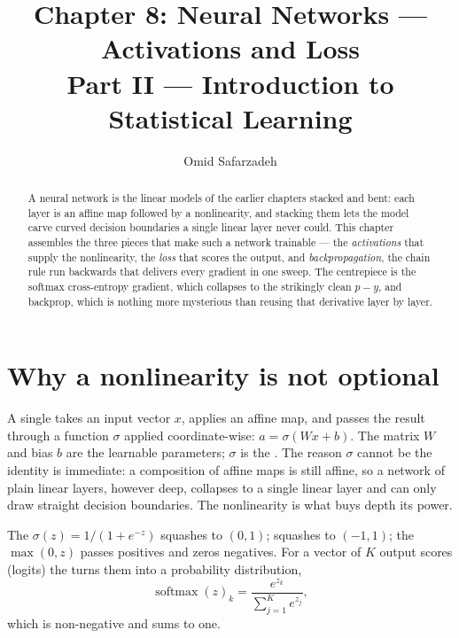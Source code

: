 \documentclass[11pt]{article}
\title{Chapter 8: Neural Networks --- Activations and Loss \\ \large Part II --- Introduction to Statistical Learning}
\author{Omid Safarzadeh}
\date{}
\begin{document}
\maketitle

\begin{abstract}
\noindent
A neural network is the linear models of the earlier chapters stacked and bent:
each layer is an affine map followed by a nonlinearity, and stacking them lets
the model carve curved decision boundaries a single linear layer never could.
This chapter assembles the three pieces that make such a network trainable ---
the \emph{activations} that supply the nonlinearity, the \emph{loss} that scores
the output, and \emph{backpropagation}, the chain rule run backwards that
delivers every gradient in one sweep. The centrepiece is the softmax
cross-entropy gradient, which collapses to the strikingly clean
$p - y$, and backprop, which is nothing more mysterious than reusing that
derivative layer by layer.
\end{abstract}

\tableofcontents

\section{Why a nonlinearity is not optional}

A single  takes an input vector $x$, applies an affine map, and
passes the result through a function $\sigma$ applied coordinate-wise:
$a = \sigma(Wx + b)$. The matrix $W$ and bias $b$ are the learnable parameters;
$\sigma$ is the . The reason $\sigma$ cannot be the identity
is immediate: a composition of affine maps is still affine, so a network of
plain linear layers, however deep, collapses to a single linear layer and can
only draw straight decision boundaries. The nonlinearity is what buys depth its
power.

\begin{definition}
The  $\sigma(z)=1/(1+e^{-z})$ squashes to $(0,1)$;
 squashes to $(-1,1)$; the  $\max(0,z)$ passes
positives and zeros negatives. For a vector of $K$ output scores (logits) the
 turns them into a probability distribution,
\[
  \operatorname{softmax}(z)_k = \frac{e^{z_k}}{\sum_{j=1}^{K} e^{z_j}} ,
\]
which is non-negative and sums to one.
\end{definition}
\end{document}
